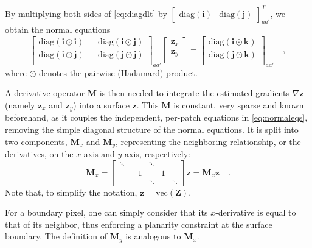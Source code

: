 By multiplying both sides of \eqref{eq:diagdlt} by $\begin{bmatrix}\mathrm{diag}(\mathbf{i}) & \mathrm{diag}(\mathbf{j}) \end{bmatrix}_{aa'}^T$, we obtain the normal equations
\begin{equation}
\label{eq:normaleqs}
\begin{bmatrix}
    \mathrm{diag}(\mathbf{i} \odot \mathbf{i}) && \mathrm{diag}(\mathbf{i} \odot \mathbf{j}) \\
    \mathrm{diag}(\mathbf{i} \odot \mathbf{j}) && \mathrm{diag}(\mathbf{j} \odot \mathbf{j}) \\
\end{bmatrix}_{aa'}
\begin{bmatrix}
\mathbf{z}_{x} \\
\mathbf{z}_{y} \\
\end{bmatrix}
=
\begin{bmatrix}
\mathrm{diag}(\mathbf{i} \odot \mathbf{k}) \\
\mathrm{diag}(\mathbf{j} \odot \mathbf{k}) \\
\end{bmatrix}_{aa'} \quad ,
\end{equation}
where $\odot$ denotes the pairwise (Hadamard) product.

A derivative operator $\mathbf{M}$ is then needed to integrate the estimated gradients $\nabla \mathbf{z}$ (namely $\mathbf{z}_x$ and $\mathbf{z}_y$) into a surface $\mathbf{z}$. This $\mathbf{M}$ is constant, very sparse and known beforehand, as it couples the independent, per-patch equations in \eqref{eq:normaleqs}, removing the simple diagonal structure of the normal equations. It is split into two components, $\mathbf{M}_x$ and $\mathbf{M}_y$, representing the neighboring relationship, or the derivatives, on the $x$-axis and $y$-axis, respectively:
\begin{equation}
\label{eq:M}
\mathbf{M}_x = 
\begin{bmatrix}
\ddots &    & \ddots &   &        \\
       & -1 &        & 1 &        \\
       &    & \ddots &   & \ddots
\end{bmatrix}
\mathbf{z} = \mathbf{M}_x\mathbf{z}  \quad.
\end{equation}
Note that, to simplify the notation, $\mathbf{z} = \mathrm{vec}(\mathbf{Z})$.

For a boundary pixel, one can simply consider that its $x$-derivative is equal to that of its neighbor, thus enforcing a planarity constraint at the surface boundary. The definition of $\mathbf{M}_y$ is analogous to $\mathbf{M}_x$.


